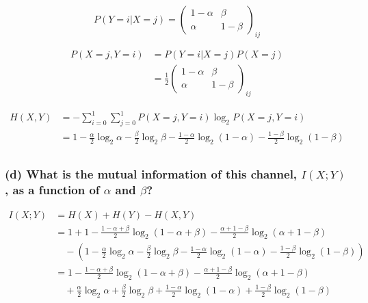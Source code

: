 \[
P(Y=i|X=j)=\begin{pmatrix}
1-\alpha&\beta\\
\alpha&1-\beta
\end{pmatrix}_{ij}
\]

\[
\begin{aligned}
P(X=j,Y=i)
&=P(Y=i|X=j)P(X=j)\\
&=\frac12\begin{pmatrix}
1-\alpha&\beta\\
\alpha&1-\beta
\end{pmatrix}_{ij}
\end{aligned}
\]

\[
\begin{aligned}
H(X,Y)
&=-\sum_{i=0}^1\sum_{j=0}^1P(X=j,Y=i)\log_2{P(X=j,Y=i)}\\
&=1-\frac{\alpha}2\log_2{\alpha}-\frac{\beta}2\log_2{\beta}-\frac{1-\alpha}2\log_2(1-\alpha)-\frac{1-\beta}2\log_2(1-\beta)\\
\end{aligned}
\]

\hypertarget{d-what-is-the-mutual-information-of-this-channel-ix-y-as-a-function-of-alpha-and-beta}{%
\subsubsection{\texorpdfstring{(d) What is the mutual information of
this channel, \(I(X; Y)\), as a function of \(\alpha\) and
\(\beta\)?}{(d) What is the mutual information of this channel, I(X; Y), as a function of \textbackslash alpha and \textbackslash beta?}}\label{d-what-is-the-mutual-information-of-this-channel-ix-y-as-a-function-of-alpha-and-beta}}

\[
\begin{aligned}
I(X;Y)
&=H(X)+H(Y)-H(X,Y)\\
&=1+1-\frac{1-\alpha+\beta}2\log_2\left(1-\alpha+\beta\right)-\frac{\alpha+1-\beta}2\log_2\left(\alpha+1-\beta\right)\\
&\quad -\left(1-\frac{\alpha}2\log_2{\alpha}-\frac{\beta}2\log_2{\beta}-\frac{1-\alpha}2\log_2(1-\alpha)-\frac{1-\beta}2\log_2(1-\beta)\right)\\
&=1-\frac{1-\alpha+\beta}2\log_2\left(1-\alpha+\beta\right)-\frac{\alpha+1-\beta}2\log_2\left(\alpha+1-\beta\right)\\
&\quad +\frac{\alpha}2\log_2{\alpha}+\frac{\beta}2\log_2{\beta}+\frac{1-\alpha}2\log_2(1-\alpha)+\frac{1-\beta}2\log_2(1-\beta)\\ 
\end{aligned}
\]

